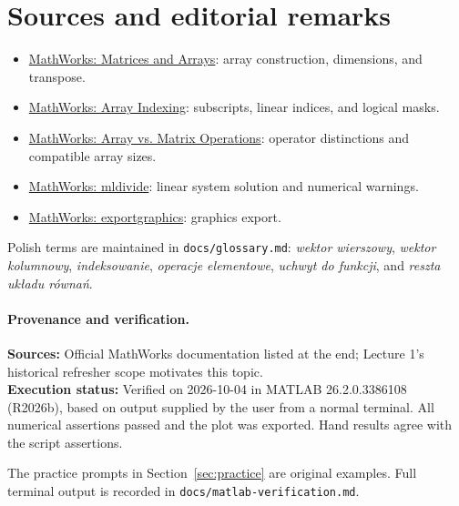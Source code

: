 \documentclass[11pt,a4paper]{article}
\begin{document}
\section{Sources and editorial remarks}\label{sec:sources}
\begin{itemize}[leftmargin=1.6em]
  \item \href{https://www.mathworks.com/help/matlab/learn_matlab/matrices-and-arrays.html}{MathWorks: Matrices and Arrays}:
        array construction, dimensions, and transpose.
  \item \href{https://www.mathworks.com/help/matlab/math/array-indexing.html}{MathWorks: Array Indexing}:
        subscripts, linear indices, and logical masks.
  \item \href{https://www.mathworks.com/help/matlab/matlab_prog/array-vs-matrix-operations.html}{MathWorks: Array vs. Matrix Operations}:
        operator distinctions and compatible array sizes.
  \item \href{https://www.mathworks.com/help/matlab/ref/double.mldivide.html}{MathWorks: mldivide}:
        linear system solution and numerical warnings.
  \item \href{https://www.mathworks.com/help/matlab/ref/exportgraphics.html}{MathWorks: exportgraphics}:
        graphics export.
\end{itemize}
Polish terms are maintained in \texttt{docs/glossary.md}: \emph{wektor wierszowy},
\emph{wektor kolumnowy}, \emph{indeksowanie}, \emph{operacje elementowe},
\emph{uchwyt do funkcji}, and \emph{reszta uk\l{}adu r\'owna\'n}.
\paragraph{Provenance and verification.}
\textbf{Sources:} Official MathWorks documentation listed at the end;
Lecture 1's historical refresher scope motivates this topic.\\
\textbf{Execution status:} Verified on 2026-10-04 in MATLAB
26.2.0.3386108 (R2026b), based on output supplied by the user from a normal terminal.
All numerical assertions passed and the plot was exported.
Hand results agree with the script assertions.

The practice prompts in Section~\ref{sec:practice} are original examples.
Full terminal output is recorded in \texttt{docs/matlab-verification.md}.
\end{document}
